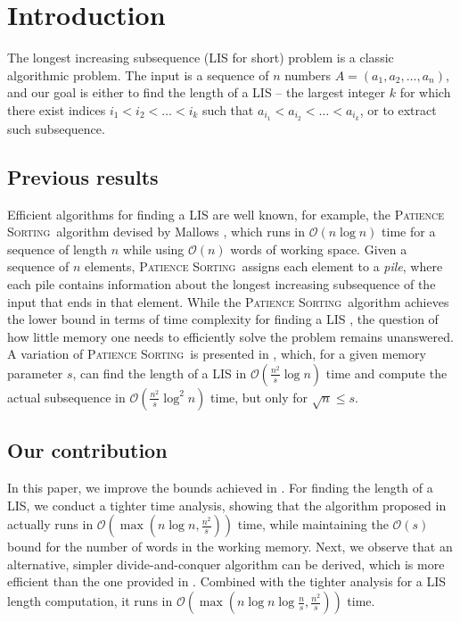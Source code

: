 \documentclass[lic, english, shortabstract]{iithesis}
\author         {Mikołaj Owczarz}
\date          {\today}                     %
\theoremstyle{plain}
\newcommand{\Psort}{\textsc{Patience Sorting}}
\theoremstyle{definition}
\begin{document}

\newpage

\section{Introduction}

The longest increasing subsequence (LIS for short) problem is a classic algorithmic problem. 
The input is a sequence of $n$ numbers $A = (a_1, a_2, \dots, a_n)$, and our goal is either to find the length of a LIS -- 
the largest integer $k$ for which there exist indices $i_1 < i_2 < \dots < i_k$ such that $a_{i_1} < a_{i_2} < \dots < a_{i_k}$, or to extract such subsequence.

\subsection{Previous results}
Efficient algorithms for finding a LIS are well known, for example, the \Psort\ algorithm devised by Mallows \cite{mallows}, which runs in $\mathcal{O}(n \log n)$ time for a sequence of length $n$ while using $\mathcal{O}(n)$ words of working space.
Given a sequence of $n$ elements, \Psort\ assigns each element to a \textit{pile}, where each pile contains information about the longest increasing subsequence of the input that ends in that element. 
While the \Psort\ algorithm achieves the lower bound in terms of time complexity for finding a LIS \cite{lis-lb}, the question of how little memory one needs to efficiently solve the problem remains unanswered. 
A variation of \Psort\ is presented in \cite{kiyomi2017space}, which, for a given memory parameter $s$, can find the length of a LIS in $\mathcal{O}(\frac{n^2}{s} \log n)$ time and compute the actual subsequence in $\mathcal{O}(\frac{n^2}{s} \log^2 n)$ time, but only for $\sqrt{n} \leq s$.

\subsection{Our contribution}
In this paper, we improve the bounds achieved in \cite{kiyomi2017space}. For finding the length of a LIS, we conduct a tighter time analysis, showing that the algorithm proposed in \cite{kiyomi2017space} actually runs in $\mathcal{O}(\max(n \log n, \frac{n^2}{s}))$ time,
while maintaining the $\mathcal{O}(s)$ bound for the number of words in the working memory. 
Next, we observe that an alternative, simpler divide-and-conquer algorithm can be derived, which is more efficient than the one provided in \cite{kiyomi2017space}.
Combined with the tighter analysis for a LIS length computation, it runs in $\mathcal{O}(\max(n \log n \log \frac{n}{s}, \frac{n^2}{s}))$ time.
\end{document}
